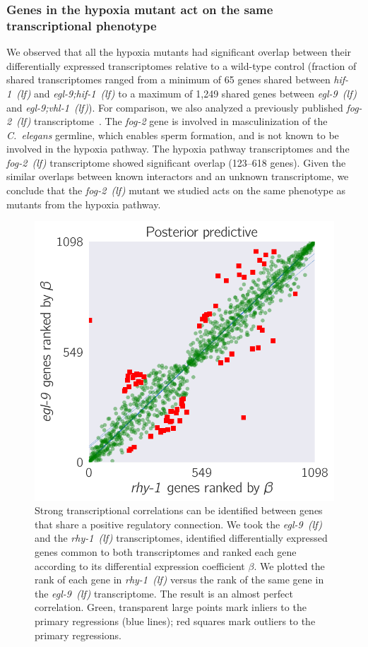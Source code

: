\documentclass[9pt,twocolumn,twoside]{pnas-new}
\newcommand{\cel}{\emph{C.~elegans}}
\newcommand{\gene}[1]{\emph{#1}}
\newcommand{\fog}{\emph{fog-2~(lf)}}
\newcommand{\egl}{\emph{egl-9~(lf)}}
\newcommand{\rhy}{\emph{rhy-1~(lf)}}
\newcommand{\eglvhl}{\emph{egl-9;vhl-1~(lf)}}
\newcommand{\eglhif}{\emph{egl-9;hif-1~(lf)}}
\newcommand{\hif}{\emph{hif-1~(lf)}}
\begin{document}
\subsubsection{Genes in the hypoxia mutant act on the same transcriptional phenotype}
\label{sec:phenotypes}
We observed that all the hypoxia mutants had significant overlap between their
differentially expressed transcriptomes relative to a wild-type control
(fraction of shared transcriptomes ranged from a minimum of 65 genes
shared between \hif{} and \eglhif{} to a maximum of 1,249 shared genes between
\egl{} and \eglvhl{}). For comparison, we also analyzed a previously published
\fog{} transcriptome~\cite{Angeles-Albores2016a}. The \gene{fog-2} gene is
involved in masculinization of the \cel{} germline, which enables sperm formation,
and is not known to be involved in the hypoxia pathway. The hypoxia
pathway transcriptomes and the \fog{} transcriptome showed significant overlap
(123--618 genes). Given the similar overlaps between known interactors and an
unknown transcriptome, we conclude that the \fog{} mutant we studied acts on the
same phenotype as mutants from the hypoxia pathway.

\begin{figure}%
\centering
\includegraphics[width=\linewidth]{figs/multiplemodes-eb.pdf}
\caption{
Strong transcriptional correlations can be identified between genes
that share a positive regulatory connection. We took the \egl{} and the \rhy{}
transcriptomes, identified differentially expressed genes common to both
transcriptomes and ranked each gene according to its differential expression
coefficient $\beta$. We plotted the rank of each gene in \rhy{} versus the
rank of the same gene in the \egl{} transcriptome. The result is an almost
perfect correlation. Green, transparent large points mark inliers to the primary
regressions (blue lines); red squares mark outliers to the primary regressions.
}
\label{fig:genetic_interactions}
\end{figure}
\end{document}
